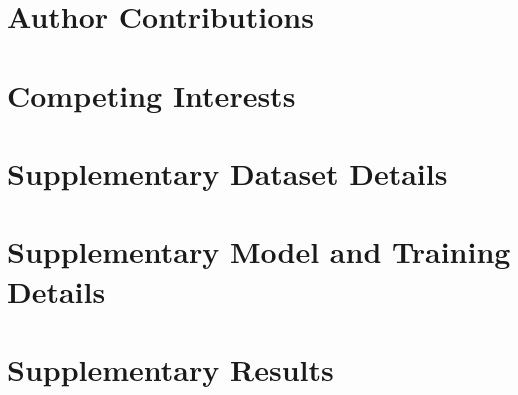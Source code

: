 \documentclass[11pt]{article}
\begin{document}
\section*{Author Contributions}

\section*{Competing Interests}

% 
% 

\appendix

\section{Supplementary Dataset Details}

\section{Supplementary Model and Training Details}

\section{Supplementary Results}
\end{document}
